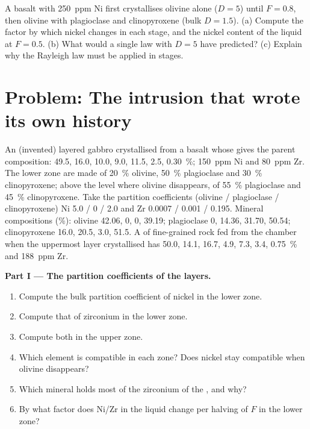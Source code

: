 \begin{exercise}[$\star\star\star$]\label{exo:b2:magmatic-differentiation:12}
A basalt with \qty{250}{ppm} Ni first crystallises olivine alone ($D = 5$) until
$F = 0.8$, then olivine with plagioclase and clinopyroxene (bulk $D = 1.5$). (a)
Compute the factor by which nickel changes in each stage, and the nickel content of
the liquid at $F = 0.5$. (b) What would a single law with $D = 5$ have predicted?
(c) Explain why the Rayleigh law must be applied in stages.
\end{exercise}

\section{Problem: The intrusion that wrote its own history}

\begin{problem}
\label{pb:b2:magmatic-differentiation:1}
An (invented) layered gabbro  crystallised from a basalt whose 
gives the parent composition:  49.5,  16.0,  10.0,
 9.0,  11.5,  2.5,  \qty{0.30}{\percent};
\qty{150}{ppm} Ni and \qty{80}{ppm} Zr. The lower zone  are made of
\qty{20}{\percent} olivine, \qty{50}{\percent} plagioclase and \qty{30}{\percent}
clinopyroxene; above the level where olivine disappears, of \qty{55}{\percent}
plagioclase and \qty{45}{\percent} clinopyroxene. Take the partition coefficients
(olivine / plagioclase / clinopyroxene) Ni 5.0 / 0 / 2.0 and Zr 0.0007 / 0.001 /
0.195. Mineral compositions (\unit{\percent}): olivine  42.06,  0,
 0,  39.19; plagioclase 0, 14.36, 31.70, 50.54; clinopyroxene
16.0, 20.5, 3.0, 51.5. A 
of fine-grained rock fed from the chamber when the uppermost layer crystallised has
 50.0,  14.1,  16.7,  4.9,  7.3,
 3.4,  \qty{0.75}{\percent} and \qty{188}{ppm} Zr.

\noindent\textbf{Part I --- The partition coefficients of the layers.}
\begin{enumerate}
\item Compute the bulk partition coefficient of nickel in the lower zone.
\item Compute that of zirconium in the lower zone.
\item Compute both in the upper zone.
\item Which element is compatible in each zone? Does nickel stay compatible when
olivine disappears?
\item Which mineral holds most of the zirconium of the , and why?
\item By what factor does Ni/Zr in the liquid change per halving of $F$ in the lower
zone?
\end{enumerate}


\end{problem}

